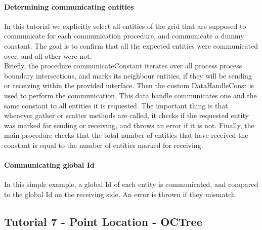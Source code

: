 \paragraph{Determining communicating entities}

In this tutorial we explicitly select all entities of the grid that are supposed to communicate for each communication procedure, and communicate a dummy constant. The goal is to confirm that all the expected entities were communicated over, and all other were not. \\

\noindent
Briefly, the procedure communicateConstant iterates over all process process boundary intersections, and marks its neighbour entities, if they will be sending or receiving within the provided interface. Then the custom DataHandleConst is used to perform the communication. This data handle communicates one and the same constant to all entities it is requested. The important thing is that whenever gather or scatter methods are called, it checks if the requested entity was marked for sending or receiving, and throws an error if it is not. Finally, the main procedure checks that the total number of entities that have received the constant is equal to the number of entities marked for receiving.


\paragraph{Communicating global Id}

In this simple example, a global Id of each entity is communicated, and compared to the global Id on the receiving side. An error is thrown if they mismatch.



\subsection{Tutorial 7 - Point Location - OCTree}
\label{usage-howto-tutorial-octree}










